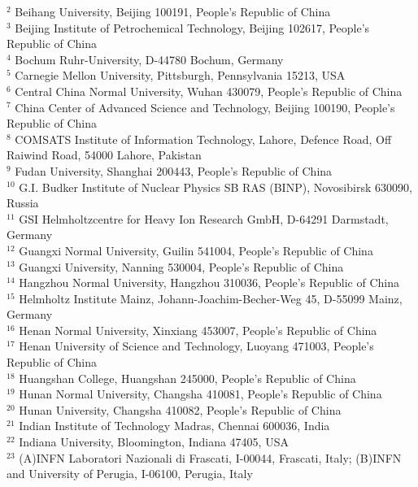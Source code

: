 \begin{small}
\begin{center}
{$^{2}$ Beihang University, Beijing 100191, People's Republic of China\\
$^{3}$ Beijing Institute of Petrochemical Technology, Beijing 102617, People's Republic of China\\
$^{4}$ Bochum Ruhr-University, D-44780 Bochum, Germany\\
$^{5}$ Carnegie Mellon University, Pittsburgh, Pennsylvania 15213, USA\\
$^{6}$ Central China Normal University, Wuhan 430079, People's Republic of China\\
$^{7}$ China Center of Advanced Science and Technology, Beijing 100190, People's Republic of China\\
$^{8}$ COMSATS Institute of Information Technology, Lahore, Defence Road, Off Raiwind Road, 54000 Lahore, Pakistan\\
$^{9}$ Fudan University, Shanghai 200443, People's Republic of China\\
$^{10}$ G.I. Budker Institute of Nuclear Physics SB RAS (BINP), Novosibirsk 630090, Russia\\
$^{11}$ GSI Helmholtzcentre for Heavy Ion Research GmbH, D-64291 Darmstadt, Germany\\
$^{12}$ Guangxi Normal University, Guilin 541004, People's Republic of China\\
$^{13}$ Guangxi University, Nanning 530004, People's Republic of China\\
$^{14}$ Hangzhou Normal University, Hangzhou 310036, People's Republic of China\\
$^{15}$ Helmholtz Institute Mainz, Johann-Joachim-Becher-Weg 45, D-55099 Mainz, Germany\\
$^{16}$ Henan Normal University, Xinxiang 453007, People's Republic of China\\
$^{17}$ Henan University of Science and Technology, Luoyang 471003, People's Republic of China\\
$^{18}$ Huangshan College, Huangshan 245000, People's Republic of China\\
$^{19}$ Hunan Normal University, Changsha 410081, People's Republic of China\\
$^{20}$ Hunan University, Changsha 410082, People's Republic of China\\
$^{21}$ Indian Institute of Technology Madras, Chennai 600036, India\\
$^{22}$ Indiana University, Bloomington, Indiana 47405, USA\\
$^{23}$ (A)INFN Laboratori Nazionali di Frascati, I-00044, Frascati, Italy; (B)INFN and University of Perugia, I-06100, Perugia, Italy\\
}
\end{center}
\end{small}
